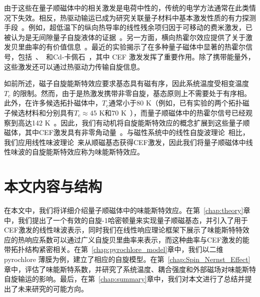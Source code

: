 由于这些在量子顺磁体中的相关激发是电荷中性的，传统的电学方法通常在此类情况下失效。相反，热驱动输运已成为研究关联量子材料中基本激发性质的有力探测手段~\cite{zhang2024Thermal, onose2010Observation, katsura2010theory}。例如，超低温下的纵向热导率的线性残余项归因于可移动的费米激发，已被认为是无间隙量子自旋液体的证据~\cite{ni2019Absence, bourgeois-hope2019Thermal, zhu2023Fluctuating}。另一方面，横向热霍尔效应提供了关于激发贝里曲率的有价值信息~\cite{zhang2024Thermal, ma2024upper, boulanger2020Thermal}。最近的实验揭示了在多种量子磁体中显著的热霍尔信号，包括~\cite{li2013Phononglasslike}、~\cite{tokiwa2016Possible}和Cd-卡佩石~\cite{akazawa2020Thermal}，其中 CEF 激发发挥了重要作用。除了携带能量外，这些激发还可以通过热驱动力传输自旋信息。

如前所述，磁子自旋能斯特效应要求基态具有磁有序，因此系统温度受相变温度 $T_c$ 的限制。然而，由于是热激发携带非零自旋，基态原则上不需要处于有序相。此外，在许多候选拓扑磁体中，$T_c$通常小于80 K（例如，已有实验的两个拓扑磁子候选材料和分别具有$T_c\approx 45$ K和$70$ K~\cite{huang2017Layerdependent, onose2010Observation}），而量子顺磁体中的热霍尔信号已经观察到高达142 K~\cite{hirschberger2015Thermal}。因此，我们有动机将自旋能斯特效应的概念扩展到这些量子顺磁体，其中CEF激发具有非零角动量~\cite{babkevich2015Neutrona, thalmeier2024Induced}。与磁性系统中的线性自旋波理论~\cite{kittel2018introduction}相比，我们应用线性味波理论~\cite{joshi1999elementary, li19984}来从顺磁基态获得CEF激发，因此我们将量子顺磁体中线性味波的自旋能斯特效应称为味能斯特效应。

\section{本文内容与结构}
在本文中，我们将详细介绍量子顺磁体中的味能斯特效应。在第~\ref{chap:theory}章中，我们提出了一个有效的自旋-1哈密顿量来实现量子顺磁基态，并引入了用于CEF激发的线性味波表示，同时我们在线性响应理论框架下展示了味能斯特特效应的热响应系数可以通过广义自旋贝里曲率来表示，而这种曲率与CEF激发的能带拓扑结构紧密相关。在第~\ref{chap:pyrochlore_model}章中，我们以二维 pyrochlore 薄膜为例，建立了相应的自旋模型。在第~\ref{chap:Spin_Nernst_Effect}章中，评估了味能斯特系数，并研究了系统温度、耦合强度和外部磁场对味能斯特自旋输运的影响。最后，在第~\ref{chap:summary}章中，我们对本文进行了总结并提出了未来研究的可能方向。


